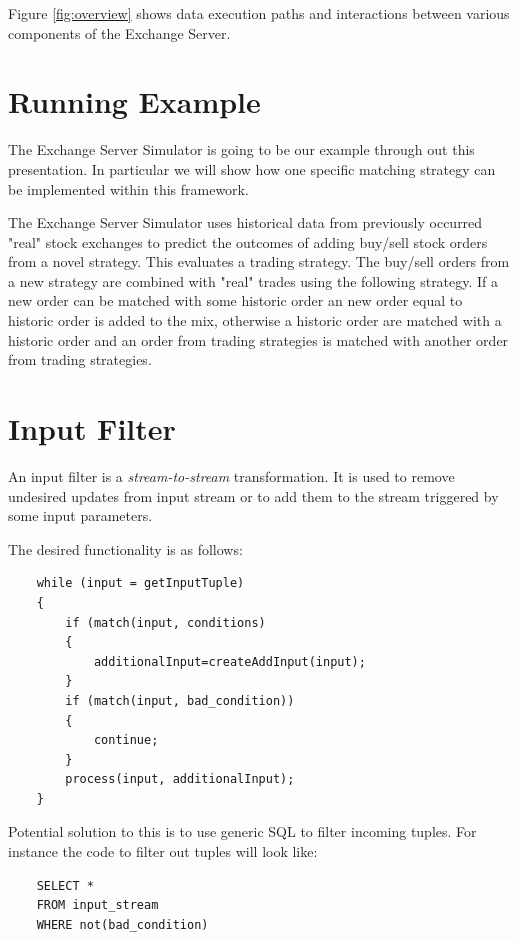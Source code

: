 \documentclass{article}
\begin{document}
Figure \ref{fig:overview} shows data execution paths and interactions between various components of the Exchange Server.

\section{Running Example}

The Exchange Server Simulator is going to be our example through out this presentation. In particular we will show how one specific matching strategy can be implemented within this framework.

The Exchange Server Simulator uses historical data from previously occurred "real" stock exchanges to predict the outcomes of adding buy/sell stock orders from a novel strategy. This evaluates a trading strategy. The buy/sell orders from a new strategy are combined with "real" trades using the following strategy. If a new order can be matched with some historic order an new order equal to historic order is added to the mix, otherwise a historic order are matched with a historic order and an order from trading strategies is matched with another order from trading strategies.

\section{Input Filter}

An input filter is a \emph{stream-to-stream} transformation. It is used to remove undesired updates from input stream or to add them to the stream triggered by some input parameters.

The desired functionality is as follows:

\begin{verbatim}   
    while (input = getInputTuple)
    {
        if (match(input, conditions)
        {
            additionalInput=createAddInput(input);
        }
        if (match(input, bad_condition))
        {
            continue;
        }
        process(input, additionalInput);
    }
\end{verbatim}


\noindent Potential solution to this is to use generic SQL to filter incoming tuples. For instance the code to filter out tuples will look like:

\begin{verbatim}   
    SELECT * 
    FROM input_stream
    WHERE not(bad_condition)
\end{verbatim}
\end{document}
